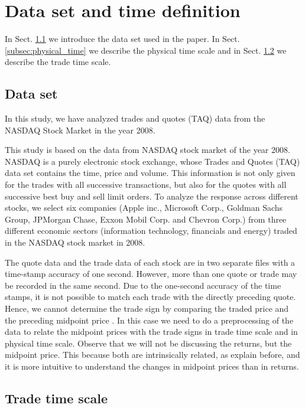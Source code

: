 \section{Data set and time definition}\label{sec:data_time}

In Sect. \ref{subsec:data_set} we introduce the data set used in the paper. In
Sect. \ref{subsec:physical_time} we describe the physical time scale and in
Sect. \ref{subsec:trade_time} we describe the trade time scale.

\subsection{Data set}\label{subsec:data_set}

In this study, we have analyzed trades and quotes (TAQ) data from the NASDAQ
Stock Market in the year 2008.

This study is based on the data from NASDAQ stock market of the year 2008.
NASDAQ is a purely electronic stock exchange, whose Trades and Quotes (TAQ)
data set contains the time, price and volume. This information is not only
given for the trades with all successive transactions, but also for the quotes
with all successive best buy and sell limit orders. To analyze the response
across different stocks, we select six companies (Apple inc., Microsoft Corp.,
Goldman Sachs Group, JPMorgan Chase, Exxon Mobil Corp. and Chevron Corp.) from
three different economic sectors (information technology, financials and
energy) traded in the NASDAQ stock market in 2008.

The quote data and the trade data of each stock are in two separate files with
a time-stamp accuracy of one second.  However, more than one quote or trade may
be recorded in the same second.
Due to the one-second accuracy of the time stamps, it is not possible to match
each trade with the directly preceding quote. Hence, we cannot determine the
trade sign by comparing the traded price and the preceding midpoint price
\cite{Wang_2016_cross}. In this case we need to do a preprocessing of the data
to relate the midpoint prices with the trade signs in trade time scale and in
physical time scale. Observe that we will not be discussing the returns, but
the midpoint price. This because both are intrinsically related, as explain
before, and it is more intuitive to understand the changes in midpoint prices
than in returns.

\subsection{Trade time scale}\label{subsec:trade_time}

